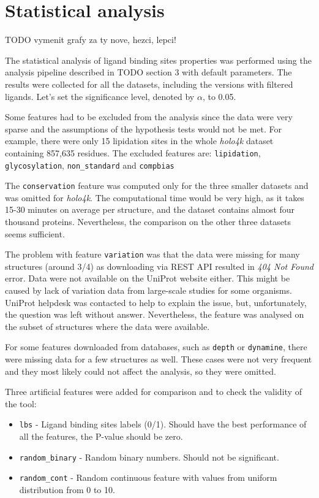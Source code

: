 \section{Statistical analysis}

TODO vymenit grafy za ty nove, hezci, lepci!

The statistical analysis of ligand binding sites properties was performed using the analysis pipeline described in TODO section 3 with default parameters. The results were collected for all the datasets, including the versions with filtered ligands. Let's set the significance level, denoted by $\alpha$, to 0.05.

Some features had to be excluded from the analysis since the data were very sparse and the assumptions of the hypothesis tests would not be met. For example, there were only 15 lipidation sites in the whole \textit{holo4k} dataset containing  857,635 residues. The excluded features are: \texttt{lipidation}, \texttt{glycosylation}, \texttt{non\_standard} and \texttt{compbias}

The \texttt{conservation} feature was computed only for the three smaller datasets and was omitted for \textit{holo4k}. The computational time would be very high, as it takes 15-30 minutes on average per structure, and the dataset contains almost four thousand proteins. Nevertheless, the comparison on the other three datasets seems sufficient.

The problem with feature \texttt{variation} was that the data were missing for many structures (around 3/4) as downloading via REST API resulted in \textit{404 Not Found} error. Data were not available on the UniProt website either. This might be caused by lack of variation data from large-scale studies for some organisms. UniProt helpdesk was contacted to help to explain the issue, but, unfortunately, the question was left without answer. Nevertheless, the feature was analysed on the subset of structures where the data were available.

For some features downloaded from databases, such as \texttt{depth} or \texttt{dynamine}, there were missing data for a few structures as well. These cases were not very frequent and they most likely could not affect the analysis, so they were omitted.

Three artificial features were added for comparison and to check the validity of the tool:
\begin{itemize}
  \item \texttt{lbs} - Ligand binding sites labels (0/1). Should have the best performance of all the features, the P-value should be zero.
  \item \texttt{random\_binary} - Random binary numbers. Should not be significant.
  \item \texttt{random\_cont} - Random continuous feature with values from uniform distribution from 0 to 10.
\end{itemize}

